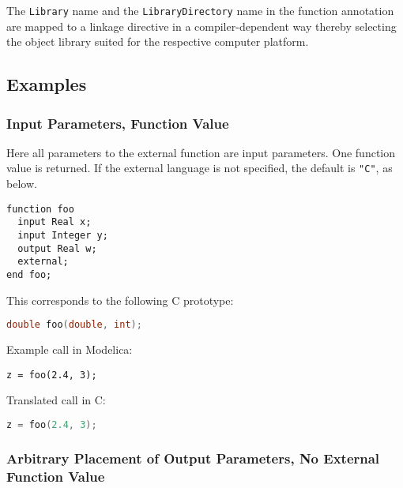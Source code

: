 The {\lstinline!Library!} name and the {\lstinline!LibraryDirectory!} name in the function annotation are mapped to a linkage directive in a compiler-dependent way thereby selecting the object library suited for the respective computer platform.

\subsection{Examples}\label{examples1}

\subsubsection{Input Parameters, Function Value}\label{input-parameters-function-value}

\begin{example}
Here all parameters to the external function are input
parameters. One function value is returned. If the external language is
not specified, the default is {\lstinline!"C"!}, as below.
\begin{lstlisting}[language=modelica]
function foo
  input Real x;
  input Integer y;
  output Real w;
  external;
end foo;
\end{lstlisting}
This corresponds to the following C prototype:
\begin{lstlisting}[language=C]
double foo(double, int);
\end{lstlisting}

Example call in Modelica:
\begin{lstlisting}[language=modelica]
z = foo(2.4, 3);
\end{lstlisting}
Translated call in C:
\begin{lstlisting}[language=C]
z = foo(2.4, 3);
\end{lstlisting}
\end{example}

\subsubsection{Arbitrary Placement of Output Parameters, No External Function Value}\label{arbitrary-placement-of-output-parameters-no-external-function-value}

